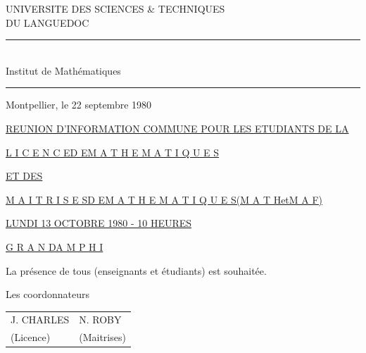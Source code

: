 UNIVERSITE DES SCIENCES \& TECHNIQUES\\
DU LANGUEDOC

\rule{3cm}{.4pt}\\
Institut de Mathématiques\\
\rule{3cm}{.4pt}

Montpellier, le 22 septembre 1980

\uline{REUNION D'INFORMATION COMMUNE POUR LES ETUDIANTS DE LA}

\uline{L I C E N C E\quad D E\quad M A T H E M A T I Q U E S}

\uline{ET DES}

\uline{M A I T R I S E S\quad D E\quad M A T H E M A T I Q U E S\quad (M A T H\quad et\quad M A F)}

\uline{LUNDI 13 OCTOBRE 1980 - 10 HEURES}

\uline{G R A N D\quad A M P H I}

La présence de tous (enseignants et étudiants) est souhaitée.

Les coordonnateurs

\begin{tabular}{ll}
J. CHARLES & N. ROBY\\
(Licence) & (Maitrises)
\end{tabular}

